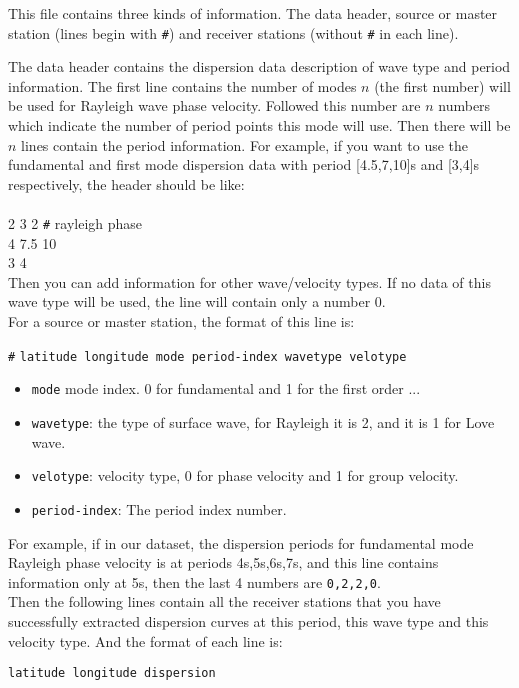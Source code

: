 \documentclass[UTF8]{article}
\begin{document}
This file contains three kinds of information. The data header, source or master station (lines begin with
\verb!#!) and receiver stations (without \verb!#! in each
line).

The data header contains the dispersion data description of wave type and period information.  The first line contains the number of modes $n$ (the first number) will be used for Rayleigh wave phase velocity. Followed this number are $n$ numbers which indicate the number of period points this mode will use. Then there will be $n$ lines contain the period information.  For example, if you want to use the fundamental and first mode dispersion data with period [4.5,7,10]s and [3,4]s respectively, the header should be like: \\ \\ 
2 3 2 \verb!#! rayleigh phase \\
4 7.5 10 \\ 
3 4 \\

Then you can add information for other wave/velocity types. If no data of this wave type will be used, the line will contain only a number 0.\\

For a source or master station, the format of 
this line is:
\begin{center}
    \verb!#! \texttt{latitude longitude mode period-index wavetype
     velotype}
\end{center}

\begin{itemize}
    \item \texttt{mode} mode index. 0 for fundamental and 1 for the first order ...
    \item \texttt{wavetype}: the type of surface wave, for 
                            Rayleigh it is 2, and it is 1 for Love wave.
    \item \texttt{velotype}: velocity type, 0 for phase velocity
                            and 1 for group velocity.
    \item \texttt{period-index}: The period index number.
\end{itemize}
For example, if in our dataset, the dispersion periods 
for fundamental mode Rayleigh phase velocity is at periods 4s,5s,6s,7s, 
and this line contains information only at 5s, then 
the last 4 numbers 
are \texttt{0,2,2,0}.\\

Then the following lines contain all the receiver stations
that you have successfully extracted dispersion curves
at this period, this wave type and this velocity type.
And the format of each line is:
\begin{center}
    \texttt{latitude longitude  dispersion}
\end{center} 
\end{document}
